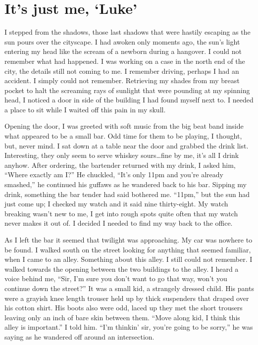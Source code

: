 \chapter{It's just me, `Luke'}



I stepped from the shadows, those last shadows that were hastily
escaping as the sun pours over the cityscape. I had awoken only
moments ago, the sun's light entering my head like the scream of a
newborn during a hangover. I could not remember what had happened.
I was working on a case in the north end of the city, the details
still not coming to me. I remember driving, perhaps I had an
accident. I simply could not remember. Retrieving my shades from my
breast pocket to halt the screaming rays of sunlight that were
pounding at my spinning head, I noticed a door in side of the
building I had found myself next to. I needed a place to sit while
I waited off this pain in my skull.



Opening the door, I was greeted with soft music from the big beat
band inside what appeared to be a small bar. Odd time for them to
be playing, I thought, but, never mind. I sat down at a table near
the door and grabbed the drink list. Interesting, they only seem to
serve whiskey sours{\ldots}fine by me, it's all I drink anyhow. After
ordering, the bartender returned with my drink, I asked him, ``Where
exactly am I?'' He chuckled, ``It's only 11pm and you're already
smashed,'' he continued his guffaws as he wandered back to his bar.
Sipping my drink, something the bar tender had said bothered me.
``11pm,'' but the sun had just come up; I checked my watch and it
said nine thirty-eight. My watch breaking wasn't new to me, I get
into rough spots quite often that my watch never makes it out of. I
decided I needed to find my way back to the office.



As I left the bar it seemed that twilight was approaching. My car
was nowhere to be found. I walked south on the street looking for
anything that seemed familiar, when I came to an alley. Something
about this alley. I still could not remember. I walked towards the
opening between the two buildings to the alley. I heard a voice
behind me, ``Sir, I'm sure you don't want to go that way, won't you
continue down the street?'' It was a small kid, a strangely dressed
child. His pants were a grayish knee length trouser held up by
thick suspenders that draped over his cotton shirt. His boots also
were odd, laced up they met the short trousers leaving only an inch
of bare skin between them. ``Move along kid, I think this alley is
important.'' I told him. ``I'm thinkin' sir, you're going to be
sorry,'' he was saying as he wandered off around an
intersection.



